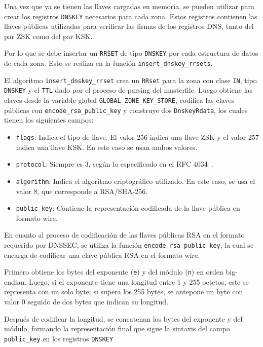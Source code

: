 Una vez que ya se tienen las llaves cargadas en memoria, se pueden utilizar para crear los registros \texttt{DNSKEY} necesarios para cada zona. Estos registros contienen las llaves públicas
utilizadas para verificar las firmas de los registros DNS, tanto del par ZSK como del par KSK.

Por lo que se debe insertar un \texttt{RRSET} de tipo \texttt{DNSKEY} por cada estructura de datos de cada zona. Esto se realiza en la función \texttt{insert\_dnskey\_rrsets}.

El algoritmo \texttt{insert\_dnskey\_rrset} crea un \texttt{RRset} para la zona con clase \texttt{IN}, tipo \texttt{DNSKEY} y el \texttt{TTL} dado por el proceso de parsing del masterfile. Luego
obtiene las claves desde la variable global \texttt{GLOBAL\_ZONE\_KEY\_STORE}, codifica las claves públicas con \texttt{encode\_rsa\_public\_key} y construye dos \texttt{DnskeyRdata}, los cuales 
tienen los siguientes campos:

\begin{itemize}
    \item \texttt{flags}: Indica el tipo de llave. El valor 256 indica una llave ZSK y el valor 257 indica una llave KSK. En este caso se usan ambos valores.
    \item \texttt{protocol}: Siempre es 3, según lo especificado en el RFC 4034~\cite{RFC4034}.
    \item \texttt{algorithm}: Indica el algoritmo criptográfico utilizado. En este caso, se usa el valor 8, que corresponde a RSA/SHA-256.
    \item \texttt{public\_key}: Contiene la representación codificada de la llave pública en formato wire.
\end{itemize}

En cuanto al proceso de codificación de las llaves públicas RSA en el formato requerido por DNSSEC, se utiliza la función \texttt{encode\_rsa\_public\_key}, la cual
se encarga de codificar una clave pública RSA en el formato wire.

Primero obtiene los bytes del exponente (\texttt{e}) y del módulo (\texttt{n}) en orden big-endian. Luego, si el exponente tiene una longitud entre 1 y 255 octetos, 
este se representa con un solo byte; si supera los 255 bytes, se antepone un byte con valor 0 seguido de dos bytes que indican su longitud. 

Después de codificar la longitud, se concatenan los bytes del exponente y del módulo, formando la representación final que sigue la sintaxis del campo \texttt{public\_key} 
en los registros \texttt{DNSKEY}

